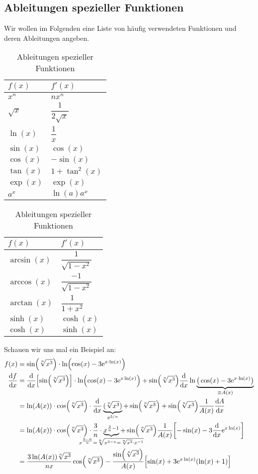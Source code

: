 \subsection{Ableitungen spezieller Funktionen}

Wir wollen im Folgenden eine Liste von häufig verwendeten Funktionen und deren Ableitungen angeben. 

\begin{table}[htp]
    \centering
    \caption{Ableitungen spezieller Funktionen}
    \begin{tabular}[t]{l l}
        \toprule
        $f(x)$ & $f'(x)$ \\
        \midrule 
        $x^n$ & $n x^n$ \\
        $\sqrt{x}$ & $\dfrac{1}{2\sqrt{x}}$ \\
        $\ln(x)$ & $\dfrac{1}{x}$ \\
        $\sin(x)$ & $\cos(x)$ \\
        $\cos(x)$ & $-\sin(x)$ \\ 
        $\tan(x)$ & $1 + \tan^2(x)$ \\
        $\exp(x)$ & $\exp(x)$ \\
        $a^x$ & $\ln(a) a^x$ 
    \end{tabular}
    \hspace{1cm}
    \begin{tabular}[t]{l l}
        \toprule
        $f(x)$ & $f'(x)$ \\
        \midrule 
        $\arcsin(x)$ & $\dfrac{1}{\sqrt{1-x^2}}$ \\
        $\arccos(x)$ & $\dfrac{-1}{\sqrt{1-x^2}}$ \\
        $\arctan(x)$ & $\dfrac{1}{1+x^2}$ \\
        $\sinh(x)$ & $\cosh(x)$ \\
        $\cosh(x)$ & $\sinh(x)$ \\
    \end{tabular}
\end{table}

Schauen wir uns mal ein Beispiel an: 
\begin{align}
    f(x) &= \sin(\sqrt[n]{x^3}) \cdot \ln(\cos(x)-3\e^{x\cdot \ln(x)}) \notag \\
    \dv{f}{x} &= \dv{x}\qty[\sin(\sqrt[n]{x^3})]\cdot \ln(\cos(x)- 3\e^{x\ln(x)}) + \sin(\sqrt[n]{x^3}) \dv{x} \ln\underbrace{\big(\cos(x)-3\e^{x\cdot \ln(x)}\big)}_{\equiv A(x)} \notag \\
    &= \ln(A(x)) \cdot \cos(\sqrt[n]{x^3}) \cdot \dv{x}\underbrace{(\sqrt[n]{x^3})}_{x^{3/n}} + \sin(\sqrt[n]{x^3}) + \sin(\sqrt[n]{x^3}) \frac{1}{A(x)} \dv{A}{x} \notag \\
    &= \ln(A(x)) \cdot \cos(\sqrt[n]{x^3}) \cdot \frac{3}{n} \cdot \underbrace{x^{\frac{3}{n}-1}}_{\mathclap{x^{\frac{3-n}{n}} =\sqrt[n]{x^{3-n} = \sqrt[n]{x^3}\cdot x^{-1}}}} + \sin(\sqrt[n]{x^3}) \frac{1}{A(x)}\qty[-\sin(x)-3 \dv{x}\e^{x \ln(x)}] \notag\\
    &= \frac{3 \ln(A(x)) \sqrt[n]{x^3}}{nx}\cos(\sqrt[n]{x^3}) - \frac{\sin(\sqrt[n]{x^3})}{A(x)} \qty[\sin(x)+3 \e^{x \ln(x)}(\ln(x)+1)]
\end{align}

